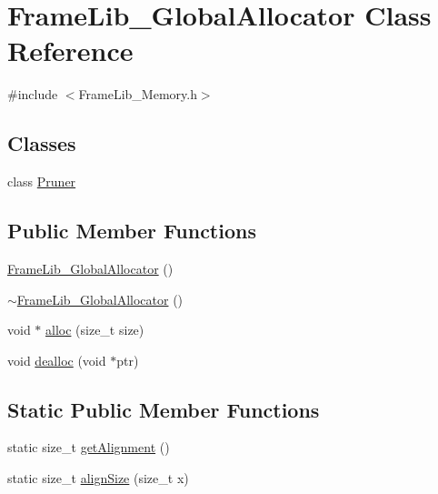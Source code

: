 \hypertarget{class_frame_lib___global_allocator}{}\section{Frame\+Lib\+\_\+\+Global\+Allocator Class Reference}
\label{class_frame_lib___global_allocator}


{\ttfamily \#include $<$Frame\+Lib\+\_\+\+Memory.\+h$>$}

\subsection*{Classes}
\begin{DoxyCompactItemize}
\item 
class \hyperlink{class_frame_lib___global_allocator_1_1_pruner}{Pruner}
\end{DoxyCompactItemize}
\subsection*{Public Member Functions}
\begin{DoxyCompactItemize}
\item 
\hyperlink{class_frame_lib___global_allocator_a0181e5afd418f9eeb13bbb293e1863e1}{Frame\+Lib\+\_\+\+Global\+Allocator} ()
\item 
\hyperlink{class_frame_lib___global_allocator_a20fa9b3b84bb54eefffb8f30a70883d5}{$\sim$\+Frame\+Lib\+\_\+\+Global\+Allocator} ()
\item 
void $\ast$ \hyperlink{class_frame_lib___global_allocator_af2ef32b9cba8f46c836be2d1df31d8a4}{alloc} (size\+\_\+t size)
\item 
void \hyperlink{class_frame_lib___global_allocator_a8cd36632acf1f6f281f50337bb95e2be}{dealloc} (void $\ast$ptr)
\end{DoxyCompactItemize}
\subsection*{Static Public Member Functions}
\begin{DoxyCompactItemize}
\item 
static size\+\_\+t \hyperlink{class_frame_lib___global_allocator_aebae4f9f17b2d460f7d27e2a68eb9ae8}{get\+Alignment} ()
\item 
static size\+\_\+t \hyperlink{class_frame_lib___global_allocator_a5568abfa871845e293c76e76a891b2ef}{align\+Size} (size\+\_\+t x)
\end{DoxyCompactItemize}


